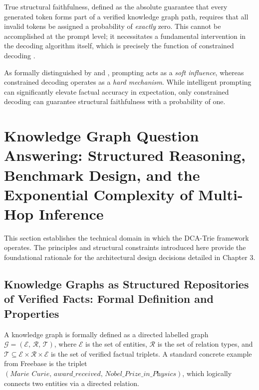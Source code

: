 True structural faithfulness, defined as the absolute guarantee that every generated token forms part of a verified knowledge graph path, requires that all invalid tokens be assigned a probability of \textit{exactly} zero. This cannot be accomplished at the prompt level; it necessitates a fundamental intervention in the decoding algorithm itself, which is precisely the function of constrained decoding \citep{geng2023gcd, willard2023outlines}.

As formally distinguished by \citet{geng2023gcd} and \citet{willard2023outlines}, prompting acts as a \textit{soft influence}, whereas constrained decoding operates as a \textit{hard mechanism}. While intelligent prompting can significantly elevate factual accuracy in expectation, only constrained decoding can guarantee structural faithfulness with a probability of one.

\section{Knowledge Graph Question Answering: Structured Reasoning, Benchmark
  Design, and the Exponential Complexity of Multi-Hop Inference}
\label{sec:kgqa}

This section establishes the technical domain in which the DCA-Trie framework operates. The principles and structural constraints introduced here provide the foundational rationale for the architectural design decisions detailed in Chapter 3.

\subsection{Knowledge Graphs as Structured Repositories of Verified Facts:
    Formal Definition and Properties}

A knowledge graph is formally defined as a directed labelled graph
$\mathcal{G} = (\mathcal{E},\, \mathcal{R},\, \mathcal{T})$, where
$\mathcal{E}$ is the set of entities, $\mathcal{R}$ is the set of relation
types, and $\mathcal{T} \subseteq \mathcal{E} \times \mathcal{R} \times
    \mathcal{E}$ is the set of verified factual triplets. A standard concrete
example from Freebase \citep{bollacker2008freebase} is the triplet
$(\textit{Marie Curie},\, \textit{award\_received},\,
    \textit{Nobel\_Prize\_in\_Physics})$, which logically connects two entities via a directed relation.

